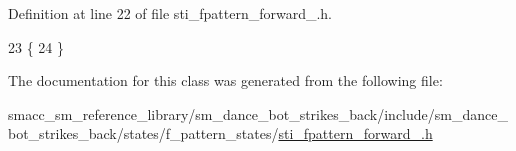 Definition at line 22 of file sti\+\_\+fpattern\+\_\+forward\+\_.\+h.


\begin{DoxyCode}
23   \{
24   \}
\end{DoxyCode}


The documentation for this class was generated from the following file\+:\begin{DoxyCompactItemize}
\item 
smacc\+\_\+sm\+\_\+reference\+\_\+library/sm\+\_\+dance\+\_\+bot\+\_\+strikes\+\_\+back/include/sm\+\_\+dance\+\_\+bot\+\_\+strikes\+\_\+back/states/f\+\_\+pattern\+\_\+states/\hyperlink{strikes__back_2include_2sm__dance__bot__strikes__back_2states_2f__pattern__states_2sti__fpattern__forward__2_8h}{sti\+\_\+fpattern\+\_\+forward\+\_.\+h}\end{DoxyCompactItemize}
